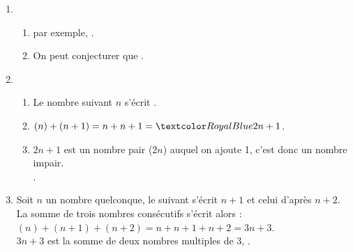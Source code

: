\begin{Maquette}[Fiche,CorrigeFin,Colonnes=2]{}
\begin{multicols}{2}
      \begin{Solution}
         \begin{enumerate}
            \item
               \begin{enumerate}
                  \item par exemple, .
                  \item On peut conjecturer que  .
               \end{enumerate}
            \setcounter{enumi}{1}
            \item
               \begin{enumerate}
                  \item Le nombre suivant $n$ s'écrit .
                  \item $(n)+(n+1) =n+n+1 =\cor{2n+1}$.
                  \item $2n+1$ est un nombre pair ($2n$) auquel on ajoute 1, c'est donc un nombre impair. \\
                     .
               \end{enumerate}
            \setcounter{enumi}{2}
            \item Soit $n$ un nombre quelconque, le suivant s'écrit $n+1$ et celui d'après $n+2$. \\
               La somme de trois nombres consécutifs s'écrit alors : \\
               $(n)+(n+1)+(n+2) =n+n+1+n+2 =3n+3$. \\
               $3n+3$ est la somme de deux nombres multiples de 3, .
         \end{enumerate}
      \end{Solution}

   \end{multicols}

\end{Maquette}


